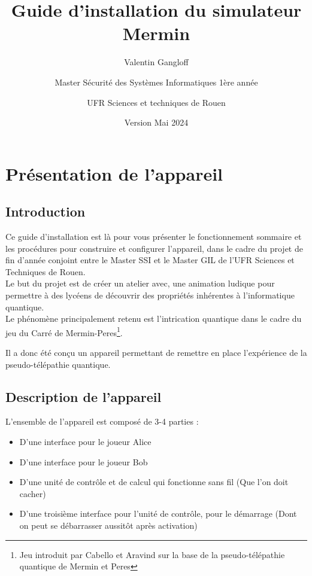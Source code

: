 \documentclass[11pt]{article}
\date{Version Mai 2024}
\author{Valentin Gangloff
\and
Master Sécurité des Systèmes Informatiques 1ère année
\and
UFR Sciences et techniques de Rouen}
\title{Guide d'installation du simulateur Mermin}
\begin{document}
\maketitle

\newpage 

\tableofcontents

\newpage

\section{Présentation de l'appareil}

\subsection{Introduction}

Ce guide d'installation est là pour vous présenter le fonctionnement sommaire et les procédures pour construire et configurer l'appareil, dans le cadre du projet de fin d'année conjoint entre le Master SSI et le Master GIL de l'UFR Sciences et Techniques de Rouen.
\\
Le but du projet est de créer un atelier avec, une animation ludique pour permettre à des lycéens de découvrir des propriétés inhérentes à l'informatique quantique.
\\

\noindent Le phénomène principalement retenu est l'intrication quantique dans le cadre du jeu du Carré de Mermin-Peres\footnote{Jeu introduit par Cabello et Aravind sur la base de la pseudo-télépathie quantique de Mermin et Peres}.

\noindent Il a donc été conçu un appareil permettant de remettre en place l'expérience de la pseudo-télépathie quantique.

\subsection{Description de l'appareil}

L'ensemble de l'appareil est composé de 3-4 parties :

\begin{itemize}
	\item D'une interface pour le joueur Alice
	\item D'une interface pour le joueur Bob
	\item D'une unité de contrôle et de calcul qui fonctionne sans fil (Que l'on doit cacher)
	\item D'une troisième interface pour l'unité de contrôle, pour le démarrage (Dont on peut se débarrasser aussitôt après activation)
\end{itemize}
\end{document}
